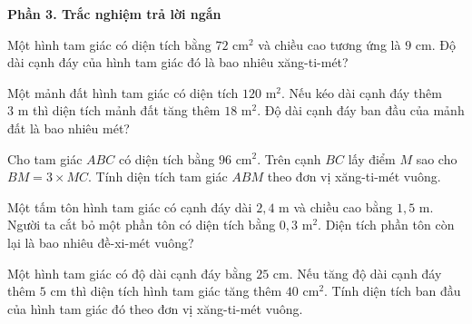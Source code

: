 \textbf{Phần 3. Trắc nghiệm trả lời ngắn}

\begin{ex} %
Một hình tam giác có diện tích bằng $72\text{ cm}^2$ và chiều cao tương ứng là $9\text{ cm}$. Độ dài cạnh đáy của hình tam giác đó là bao nhiêu xăng-ti-mét?
\end{ex}

\begin{ex} %
Một mảnh đất hình tam giác có diện tích $120\text{ m}^2$. Nếu kéo dài cạnh đáy thêm $3\text{ m}$ thì diện tích mảnh đất tăng thêm $18\text{ m}^2$. Độ dài cạnh đáy ban đầu của mảnh đất là bao nhiêu mét?
\end{ex}

\begin{ex} %
Cho tam giác $ABC$ có diện tích bằng $96\text{ cm}^2$. Trên cạnh $BC$ lấy điểm $M$ sao cho $BM = 3 \times MC$. Tính diện tích tam giác $ABM$ theo đơn vị xăng-ti-mét vuông.
\end{ex}

\begin{ex} %
Một tấm tôn hình tam giác có cạnh đáy dài $2{,}4\text{ m}$ và chiều cao bằng $1{,}5\text{ m}$. Người ta cắt bỏ một phần tôn có diện tích bằng $0{,}3\text{ m}^2$. Diện tích phần tôn còn lại là bao nhiêu đề-xi-mét vuông?
\end{ex}

\begin{ex} %
Một hình tam giác có độ dài cạnh đáy bằng $25\text{ cm}$. Nếu tăng độ dài cạnh đáy thêm $5\text{ cm}$ thì diện tích hình tam giác tăng thêm $40\text{ cm}^2$. Tính diện tích ban đầu của hình tam giác đó theo đơn vị xăng-ti-mét vuông.
\end{ex}

